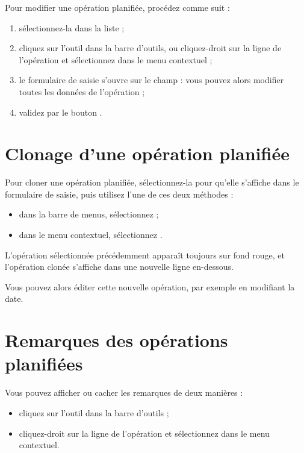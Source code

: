 Pour modifier une opération planifiée, procédez comme suit :

\begin{enumerate}
	 \item sélectionnez-la dans la liste ;
	 \item cliquez sur l'outil  dans la barre d'outils, ou cliquez-droit sur la ligne de l'opération et sélectionnez  dans le menu contextuel ;
	 \item le formulaire de saisie s'ouvre sur le champ   : vous pouvez alors modifier toutes les données de l'opération ;
	 \item validez par le bouton .
\end{enumerate}


\section{Clonage d'une opération planifiée\label{plannedtransactions-duplicate}}


Pour cloner une opération planifiée, sélectionnez-la pour qu'elle s'affiche dans le formulaire de saisie, puis utilisez l'une de ces deux méthodes :

\begin{itemize}
	 \item dans la barre de menus, sélectionnez  ;
	 \item dans le menu contextuel, sélectionnez .
\end{itemize}

L'opération sélectionnée précédemment apparaît toujours sur fond  rouge{\couleur}, et l'opération clonée s'affiche dans une nouvelle ligne en-dessous.

Vous pouvez alors éditer cette nouvelle opération, par exemple en modifiant la date.


\section{Remarques des opérations planifiées\label{plannedtransactions-comments}}


Vous pouvez afficher ou cacher les remarques de deux manières :

\begin{itemize}
	 \item cliquez sur l'outil  dans la barre d'outils ;
	 \item cliquez-droit sur la ligne de l'opération et sélectionnez  dans le menu contextuel.
\end{itemize}

